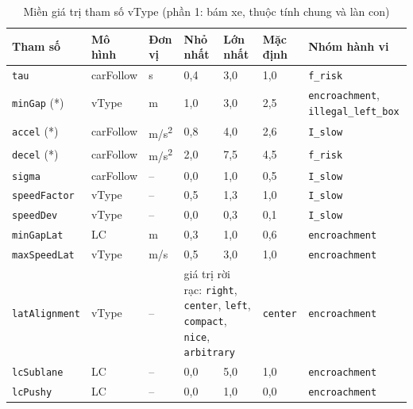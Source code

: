 \documentclass[../main.tex]{subfiles}
\begin{document}
\begin{table}[!htbp]
\centering
\small\setlength{\tabcolsep}{3pt}
\caption{Miền giá trị tham số vType (phần 1: bám xe, thuộc tính chung và làn con)}
\label{table:appendix_bounds_1}
\begin{tabular}{|p{3.0cm}|p{1.7cm}|p{1.15cm}|p{1.1cm}|p{1.1cm}|p{1.5cm}|p{3.1cm}|}
\hline
\textbf{Tham số} & \textbf{Mô hình} & \textbf{Đơn vị} & \textbf{Nhỏ nhất} & \textbf{Lớn nhất} & \textbf{Mặc định} & \textbf{Nhóm hành vi} \\ \hline
\texttt{tau} & carFollow & s & 0,4 & 3,0 & 1,0 & \texttt{f\_\allowbreak risk} \\ \hline
\texttt{minGap} (*) & vType & m & 1,0 & 3,0 & 2,5 & \texttt{encroachment}, \texttt{illegal\_\allowbreak left\_\allowbreak box} \\ \hline
\texttt{accel} (*) & carFollow & m/s\textsuperscript{2} & 0,8 & 4,0 & 2,6 & \texttt{I\_\allowbreak slow} \\ \hline
\texttt{decel} (*) & carFollow & m/s\textsuperscript{2} & 2,0 & 7,5 & 4,5 & \texttt{f\_\allowbreak risk} \\ \hline
\texttt{sigma} & carFollow & -- & 0,0 & 1,0 & 0,5 & \texttt{I\_\allowbreak slow} \\ \hline
\texttt{speedFactor} & vType & -- & 0,5 & 1,3 & 1,0 & \texttt{I\_\allowbreak slow} \\ \hline
\texttt{speedDev} & vType & -- & 0,0 & 0,3 & 0,1 & \texttt{I\_\allowbreak slow} \\ \hline
\texttt{minGapLat} & LC & m & 0,3 & 1,0 & 0,6 & \texttt{encroachment} \\ \hline
\texttt{maxSpeedLat} & vType & m/s & 0,5 & 3,0 & 1,0 & \texttt{encroachment} \\ \hline
\texttt{latAlignment} & vType & -- & \multicolumn{2}{p{2.2cm}|}{giá trị rời rạc: \texttt{right}, \texttt{center}, \texttt{left}, \texttt{compact}, \texttt{nice}, \texttt{arbitrary}} & \texttt{center} & \texttt{encroachment} \\ \hline
\texttt{lcSublane} & LC & -- & 0,0 & 5,0 & 1,0 & \texttt{encroachment} \\ \hline
\texttt{lcPushy} & LC & -- & 0,0 & 1,0 & 0,0 & \texttt{encroachment} \\ \hline
\end{tabular}
\end{table}
\end{document}
